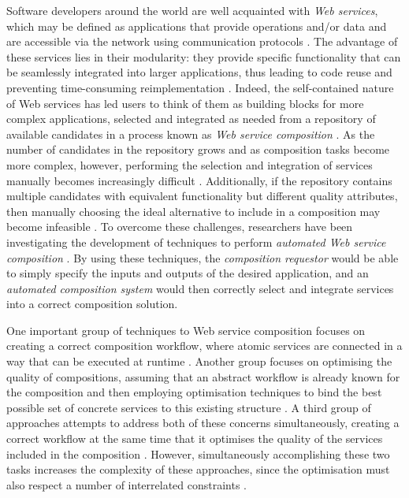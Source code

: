 \documentclass{llncs}
\begin{document}
Software developers around the world are well acquainted with \textit{Web services}, which may be defined as applications that provide operations and/or data and are accessible via the network using communication protocols \cite{gottschalk2002introduction}. The advantage of these services lies in their modularity: they provide specific functionality that can be seamlessly integrated into larger applications, thus leading to code reuse and preventing time-consuming reimplementation \cite{dustdar2008services}. Indeed, the self-contained nature of Web services has led users to think of them as building blocks for more complex applications, selected and integrated as needed from a repository of available candidates in a process known as \textit{Web service composition} \cite{dustdar2008services}. As the number of candidates in the repository grows and as composition tasks become more complex, however, performing the selection and integration of services manually becomes increasingly difficult \cite{lecue2006formal}. Additionally, if the repository contains multiple candidates with equivalent functionality but different quality attributes, then manually choosing the ideal alternative to include in a composition may become infeasible \cite{gronmo2005model}. To overcome these challenges, researchers have been investigating the development of techniques to perform \textit{automated Web service composition} \cite{milanovic2004current}. By using these techniques, the \textit{composition requestor} would be able to simply specify the inputs and outputs of the desired application, and an \textit{automated composition system} would then correctly select and integrate services into a correct composition solution.

One important group of techniques to Web service composition focuses on creating a correct composition workflow, where atomic services are connected in a way that can be executed at runtime \cite{rodriguez2010composition}. Another group focuses on optimising the quality of compositions, assuming that an abstract workflow is already known for the composition and then employing optimisation techniques to bind the best possible set of concrete services to this existing structure \cite{wang2010improved,amiri2012effective}. A third group of approaches attempts to address both of these concerns simultaneously, creating a correct workflow at the same time that it optimises the quality of the services included in the composition \cite{da2015graphevol}. However, simultaneously accomplishing these two tasks increases the complexity of these approaches, since the optimisation must also respect a number of interrelated constraints \cite{venkatraman2005generic}.
\end{document}
